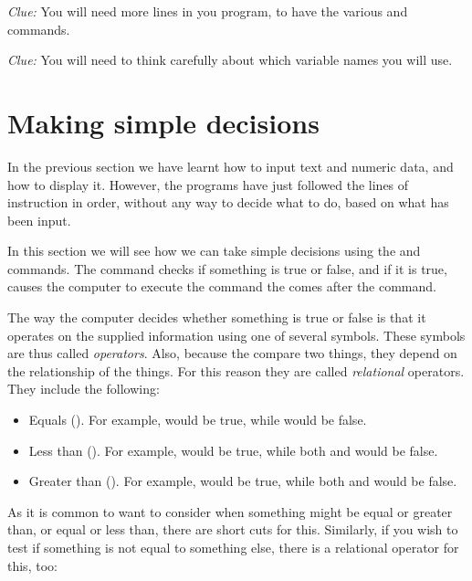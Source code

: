 {\em Clue:} You will need more lines in you program, to have the
various  and  commands.

{\em Clue:} You will need to think carefully about which variable
names you will use.

\section{Making simple decisions}

In the previous section we have learnt how to input text and numeric
data, and how to display it.  However, the programs have just
followed the lines of instruction in order, without any way to decide
what to do, based on what has been input.

In this section we will see how we can take simple decisions using the
 and
 commands.
The  command checks if something is true or false, and if it
is true, causes the computer to execute the command the comes after
the  command.

The way the computer decides whether something is true or false is
that it operates on the supplied information using one of several
symbols. These symbols are thus called {\em operators}.  Also, because
the compare two things, they depend on the relationship of the
things.  For this reason they are called {\em relational}
operators.
They include the following:

\begin{itemize}
  \item Equals (\stw{=}). For example,  would be true,
    while  would be false.
  \item Less than (\stw{<}). For example,  would be true,
    while both  and  would be false.
  \item Greater than (\stw{>}). For example,  would be
    true, while both  and  would be false.
\end{itemize}

As it is common to want to consider when something might be equal or
greater than, or equal or less than, there are short cuts for
this. Similarly, if you wish to test if something is not equal to
something else, there is a relational operator for this, too:

